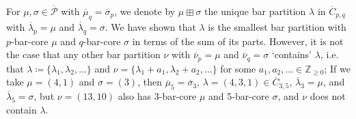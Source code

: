 \documentclass[ALCO, Unicode,published]{cedram}
\begin{document}
\begin{rema*}
For $\mu,\sigma\in\overline{\mathcal{P}}$ with $\overline{\mu}_q=\overline{\sigma}_p$, we denote by $\mu\boxplus\sigma$ the unique bar partition $\lambda$ in $\overline{C}_{p,q}$ with $\overline{\lambda}_p=\mu$ and $\overline{\lambda}_q=\sigma$. We have shown that $\lambda$ is the smallest bar partition with $p$-bar-core $\mu$ and $q$-bar-core $\sigma$ in terms of the sum of its parts. However, it is not the case that any other bar partition $\nu$ with $\overline{\nu}_p=\mu$ and $\overline{\nu}_q=\sigma$ `contains' $\lambda$, i.e. that $\lambda\coloneqq\{\lambda_1,\lambda_2,\dots\}$ and $\nu=\{\lambda_1+a_1,\lambda_2+a_2,\dots\}$ for some $a_1,a_2,\dots\in\mathbb{Z}_{\geq0}$; If we take $\mu=(4,1)$ and $\sigma=(3)$, then $\overline{\mu}_5=\overline{\sigma}_3$, $\lambda=(4,3,1)\in\overline{C}_{3,5}$, $\overline{\lambda}_3=\mu$, and $\overline{\lambda}_5=\sigma$, but $\nu=(13,10)$ also has 3-bar-core $\mu$ and 5-bar-core $\sigma$, and $\nu$ does not contain $\lambda$.
\end{rema*}
\end{document}
